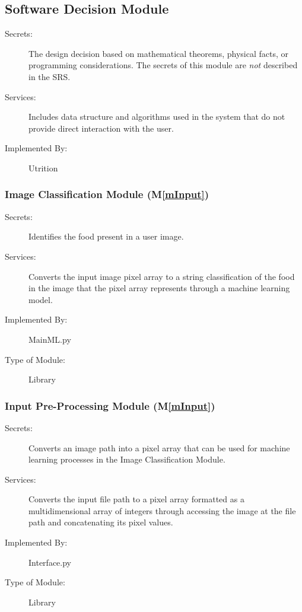\documentclass[12pt, titlepage]{article}
\newcommand{\mref}[1]{M\ref{#1}}
\begin{document}
\subsection{Software Decision Module}

\begin{description}
\item[Secrets:] The design decision based on mathematical theorems, physical
  facts, or programming considerations. The secrets of this module are
  \emph{not} described in the SRS.
\item[Services:] Includes data structure and algorithms used in the system that
  do not provide direct interaction with the user. 
\item[Implemented By:] Utrition
\end{description}

\subsubsection{Image Classification Module (\mref{mInput})}

\begin{description}
\item[Secrets:] Identifies the food present in a user image.
\item[Services:]Converts the input image pixel array to a string classification 
of the food in the image that the pixel array represents through a machine 
learning model.
\item[Implemented By:] MainML.py
\item[Type of Module:] Library
\end{description}

\subsubsection{Input Pre-Processing Module (\mref{mInput})}

\begin{description}
\item[Secrets:] Converts an image path into a pixel array that can be used for machine learning processes in the Image Classification Module.
\item[Services:] Converts the input file path to a pixel array formatted as a multidimensional array of integers through accessing the image at the file path and concatenating its pixel values.
\item[Implemented By:] Interface.py
\item[Type of Module:] Library
\end{description}
\end{document}
